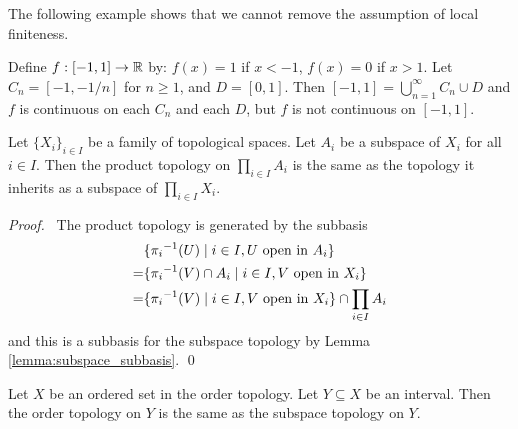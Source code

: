 The following example shows that we cannot remove the assumption of local finiteness.

\begin{example}
    Define $f : [-1,1] \rightarrow \mathbb{R}$ by: $f(x) = 1$ if $x < -1$, $f(x) = 0$ if $x > 1$. Let $C_n = [-1,-1/n]$ for $n \geq 1$, and $D = [0,1]$. Then
    $[-1,1] = \bigcup_{n=1}^\infty C_n \cup D$ and $f$ is continuous on each $C_n$ and each $D$, but $f$ is not continuous on $[-1,1]$.    
\end{example}

\begin{theorem}
    Let $\{ X_i \}_{i \in I}$ be a family of topological spaces. Let $A_i$ be a subspace of $X_i$ for all $i \in I$.
    Then the product topology on $\prod_{i \in I} A_i$ is the same as the topology it inherits as a subspace of
    $\prod_{i \in I} X_i$.
\end{theorem}

\begin{proof}
    \pf\ The product topology is generated by the subbasis
    \begin{align*}
        & \{ {\pi_i}^{-1}(U) \mid i \in I, U \text{ open in } A_i \} \\
        = & \{ {\pi_i}^{-1}(V) \cap A_i \mid i \in I, V \text{ open in } X_i \} \\
        = & \{ {\pi_i}^{-1}(V) \mid i \in I, V \text{ open in } X_i \} \cap \prod_{i \in I} A_i
    \end{align*}
    and this is a subbasis for the subspace topology by Lemma \ref{lemma:subspace_subbasis}. \qed
\end{proof}

\begin{theorem}
    Let $X$ be an ordered set in the order topology. Let $Y \subseteq X$ be an interval. Then the order topology
    on $Y$ is the same as the subspace topology on $Y$.
\end{theorem}

